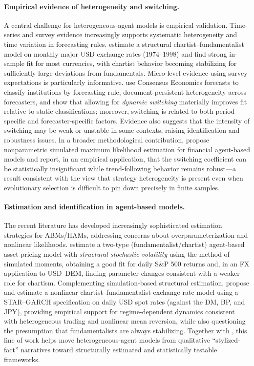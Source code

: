 \documentclass[a4paper,10pt,final]{article}    %
\begin{document}
\paragraph{Empirical evidence of heterogeneity and switching.}
A central challenge for heterogeneous-agent models is empirical validation. Time-series and survey evidence increasingly supports systematic heterogeneity and time variation in forecasting rules. \citet{manzan2007heterogeneous} estimate a structural chartist--fundamentalist model on monthly major USD exchange rates (1974--1998) and find strong in-sample fit for most currencies, with chartist behavior becoming stabilizing for sufficiently large deviations from fundamentals. Micro-level evidence using survey expectations is particularly informative. \citet{goldbaum2014empirical} use Consensus Economics forecasts to classify institutions by forecasting rule, document persistent heterogeneity across forecasters, and show that allowing for \emph{dynamic switching} materially improves fit relative to static classifications; moreover, switching is related to both period-specific and forecaster-specific factors.
Evidence also suggests that the intensity of switching may be weak or unstable in some contexts, raising identification and robustness issues. In a broader methodological contribution, \citet{kukacka2017estimation} propose nonparametric simulated maximum likelihood estimation for financial agent-based models and report, in an empirical application, that the switching coefficient can be statistically insignificant while trend-following behavior remains robust---a result consistent with the view that strategy heterogeneity is present even when evolutionary selection is difficult to pin down precisely in finite samples.

\paragraph{Estimation and identification in agent-based models.}
The recent literature has developed increasingly sophisticated estimation strategies for ABMs/HAMs, addressing concerns about overparameterization and nonlinear likelihoods. \citet{franke2011estimation} estimate a two-type (fundamentalist/chartist) agent-based asset-pricing model with \emph{structural stochastic volatility} using the method of simulated moments, obtaining a good fit for daily S\&P 500 returns and, in an FX application to USD--DEM, finding parameter changes consistent with a weaker role for chartism. Complementing simulation-based structural estimation, \citet{WesterhoffReitz2003} propose and estimate a nonlinear chartist--fundamentalist exchange-rate model using a STAR--GARCH specification on daily USD spot rates (against the DM, BP, and JPY), providing empirical support for regime-dependent dynamics consistent with heterogeneous trading and nonlinear mean reversion, while also questioning the presumption that fundamentalists are always stabilizing. Together with \citet{kukacka2017estimation}, this line of work helps move heterogeneous-agent models from qualitative ``stylized-fact'' narratives toward structurally estimated and statistically testable frameworks.
\end{document}
